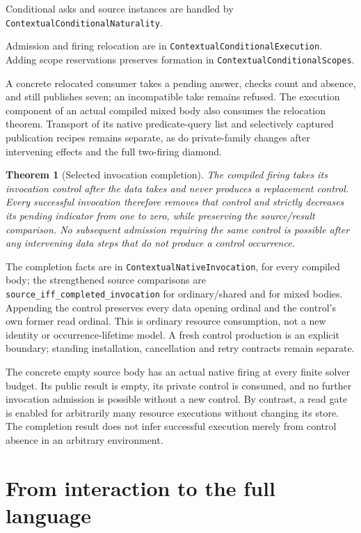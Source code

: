 \documentclass[11pt]{article}
\newtheorem{theorem}{Theorem}
\newcommand{\code}[1]{\texttt{\small #1}}
\begin{document}
Conditional asks and source instances are handled by
\code{ContextualConditionalNaturality}.

Admission and firing relocation are in
\code{ContextualConditionalExecution}. Adding scope reservations preserves
formation in \code{ContextualConditionalScopes}.

A concrete relocated
consumer takes a pending answer, checks count and absence, and still
publishes seven; an incompatible take remains refused. The execution
component of an actual compiled mixed body also consumes the relocation
theorem. Transport of its native predicate-query list and selectively
captured publication recipes remains separate, as do private-family changes
after intervening effects and the full two-firing diamond.

\begin{theorem}[Selected invocation completion]
The compiled firing takes its invocation control after the data takes
and never produces a replacement control. Every successful invocation
therefore removes that control and strictly decreases its pending
indicator from one to zero, while preserving the source/result comparison.
No subsequent admission requiring the same control is possible after any
intervening data steps that do not produce a control occurrence.
\end{theorem}
The completion facts are in \code{ContextualNativeInvocation}, for every
compiled body; the strengthened source comparisons are
\code{source\_iff\_completed\_invocation} for ordinary/shared and for mixed
bodies.
Appending the control preserves every data opening ordinal and the
control's own former read ordinal. This is ordinary resource consumption,
not a new identity or occurrence-lifetime model. A fresh control production
is an explicit boundary; standing installation, cancellation and retry
contracts remain separate.

The concrete empty source body has an actual native firing at every finite
solver budget. Its public result is empty, its private control is consumed,
and no further invocation admission is possible without a new control.
By contrast, a read gate is enabled for arbitrarily many resource
executions without changing its store. The completion result does not
infer successful execution merely from control absence in an arbitrary
environment.

\section{From interaction to the full language}
\end{document}
